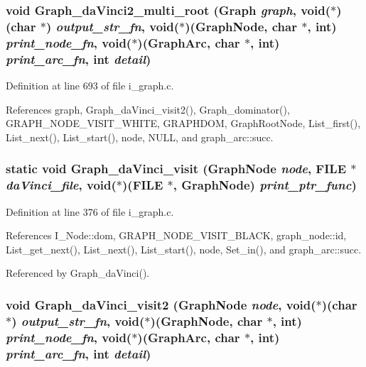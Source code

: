 \subsubsection{\setlength{\rightskip}{0pt plus 5cm}void Graph\_\-da\-Vinci2\_\-multi\_\-root (\bf{Graph} {\em graph}, void($\ast$)(char $\ast$) {\em output\_\-str\_\-fn}, void($\ast$)(\bf{Graph\-Node}, char $\ast$, int) {\em print\_\-node\_\-fn}, void($\ast$)(\bf{Graph\-Arc}, char $\ast$, int) {\em print\_\-arc\_\-fn}, int {\em detail})}\label{i__graph_8c_06a5e91ba1401615784cb7931a1142ec}




Definition at line 693 of file i\_\-graph.c.

References graph, Graph\_\-da\-Vinci\_\-visit2(), Graph\_\-dominator(), GRAPH\_\-NODE\_\-VISIT\_\-WHITE, GRAPHDOM, Graph\-Root\-Node, List\_\-first(), List\_\-next(), List\_\-start(), node, NULL, and graph\_\-arc::succ.
\subsubsection{\setlength{\rightskip}{0pt plus 5cm}static void Graph\_\-da\-Vinci\_\-visit (\bf{Graph\-Node} {\em node}, FILE $\ast$ {\em da\-Vinci\_\-file}, void($\ast$)(FILE $\ast$, \bf{Graph\-Node}) {\em print\_\-ptr\_\-func})\hspace{0.3cm}{\tt  [static]}}\label{i__graph_8c_36d31c766bdb31028837813e916b27ef}




Definition at line 376 of file i\_\-graph.c.

References I\_\-Node::dom, GRAPH\_\-NODE\_\-VISIT\_\-BLACK, graph\_\-node::id, List\_\-get\_\-next(), List\_\-next(), List\_\-start(), node, Set\_\-in(), and graph\_\-arc::succ.

Referenced by Graph\_\-da\-Vinci().
\subsubsection{\setlength{\rightskip}{0pt plus 5cm}void Graph\_\-da\-Vinci\_\-visit2 (\bf{Graph\-Node} {\em node}, void($\ast$)(char $\ast$) {\em output\_\-str\_\-fn}, void($\ast$)(\bf{Graph\-Node}, char $\ast$, int) {\em print\_\-node\_\-fn}, void($\ast$)(\bf{Graph\-Arc}, char $\ast$, int) {\em print\_\-arc\_\-fn}, int {\em detail})}\label{i__graph_8c_877ba86aed2815af4369bb2ce58c0542}




